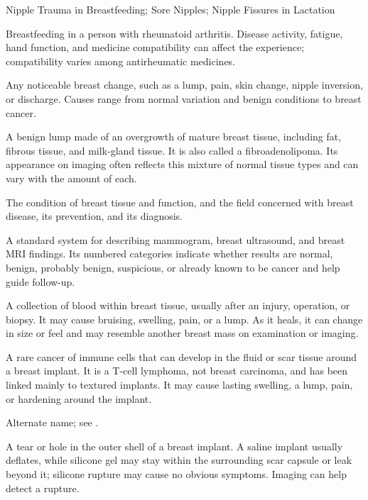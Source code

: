 \synonyms
Nipple Trauma in Breastfeeding; Sore Nipples; Nipple Fissures in Lactation

 Breastfeeding in a person
with rheumatoid arthritis. Disease activity, fatigue, hand function, and
medicine compatibility can affect the experience; compatibility varies among
antirheumatic medicines.

 Any noticeable breast change, such as a lump, pain,
skin change, nipple inversion, or discharge. Causes range from normal variation
and benign conditions to breast cancer.

 A benign lump made of an overgrowth of mature
  breast tissue, including fat, fibrous tissue, and milk-gland tissue.
  It is also called a fibroadenolipoma. Its appearance on imaging often
  reflects this mixture of normal tissue types and can vary with the
  amount of each.

 The condition of breast tissue and function, and the field concerned with breast disease, its prevention, and its diagnosis.

 A standard system for describing mammogram, breast ultrasound, and breast MRI findings. Its numbered categories indicate whether results are normal, benign, probably benign, suspicious, or already known to be cancer and help guide follow-up.

 A collection of blood within breast tissue,
  usually after an injury, operation, or biopsy. It may cause bruising,
  swelling, pain, or a lump. As it heals, it can change in size or feel
  and may resemble another breast mass on examination or imaging.

 A
  rare cancer of immune cells that can develop in the fluid or scar
  tissue around a breast implant. It is a T-cell lymphoma, not breast
  carcinoma, and has been linked mainly to textured implants. It may
  cause lasting swelling, a lump, pain, or hardening around the implant.

 Alternate name; see
  .

 A tear or hole in the outer shell of a
  breast implant. A saline implant usually deflates, while silicone gel
  may stay within the surrounding scar capsule or leak beyond it;
  silicone rupture may cause no obvious symptoms. Imaging can help
  detect a rupture.

